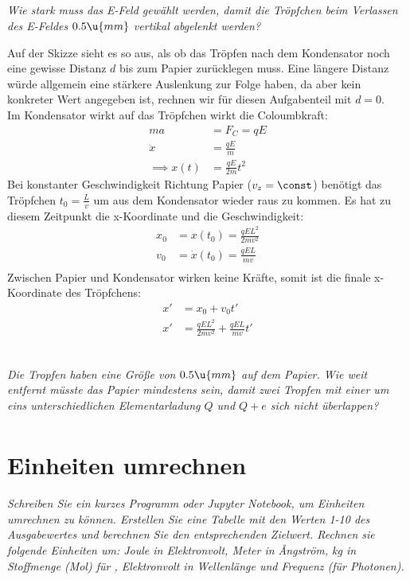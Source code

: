 \documentclass[ex,minted,hatbasis]{exercise_4.0}
\begin{document}
\subsection{}
{\it Wie stark muss das E-Feld gewählt werden, damit die Tröpfchen beim Verlassen des E-Feldes $0.5 \u{mm}$ vertikal abgelenkt werden?}\vspace{2ex}

Auf der Skizze sieht es so aus, als ob das Tröpfen nach dem Kondensator noch eine gewisse Distanz $d$ bis zum Papier zurücklegen muss. Eine längere Distanz würde allgemein eine stärkere Auslenkung zur Folge haben, da aber kein konkreter Wert angegeben ist, rechnen wir für diesen Aufgabenteil mit $d=0$.\\[1ex] Im Kondensator wirkt auf das Tröpfchen wirkt die Coloumbkraft:
\begin{align*}
    m a &= F_C = q E\\
    \ddot x &= \frac{qE}{m}\\
    \implies x(t) &= \frac{qE}{2m} t^2
\end{align*}
Bei konstanter Geschwindigkeit Richtung Papier ($v_z = \const$) benötigt das Tröpfchen $t_0 = \frac{L}{v}$ um aus dem Kondensator wieder raus zu kommen.
Es hat zu diesem Zeitpunkt die x-Koordinate und die Geschwindigkeit:
\begin{align*}
    x_0 &= x(t_0) = \frac{q E L^2}{2 m v^2}\\
    v_0 &= \dot x(t_0) = \frac{q E L}{m v}\\
\end{align*}
Zwischen Papier und Kondensator wirken keine Kräfte, somit ist die finale x-Koordinate des Tröpfchens:
\begin{align*}
    x' &= x_0 + v_0 t'\\ 
    x' &= \frac{q E L^2}{2 m v^2} + \frac{q E L}{m v} t'\\
\end{align*}


\subsection{}
{\it Die Tropfen haben eine Größe von $0.5 \u{mm}$ auf dem Papier. Wie weit entfernt müsste das Papier mindestens sein, damit zwei Tropfen mit einer um eins unterschiedlichen Elementarladung $Q$ und $Q + e$ sich nicht überlappen?}\vspace{2ex}
\begin{align*}
\end{align*}

\section{Einheiten umrechnen}
\textit{Schreiben Sie ein kurzes Programm oder Jupyter Notebook, um Einheiten umrechnen zu können. Erstellen
Sie eine Tabelle mit den Werten 1-10 des Ausgabewertes und berechnen Sie den entsprechenden Zielwert. Rechnen sie folgende Einheiten um: Joule in Elektronvolt, Meter in Ångström, kg in Stoffmenge (Mol) für , 
Elektronvolt in Wellenlänge und Frequenz (für Photonen).}\vspace{1ex}
\end{document}
